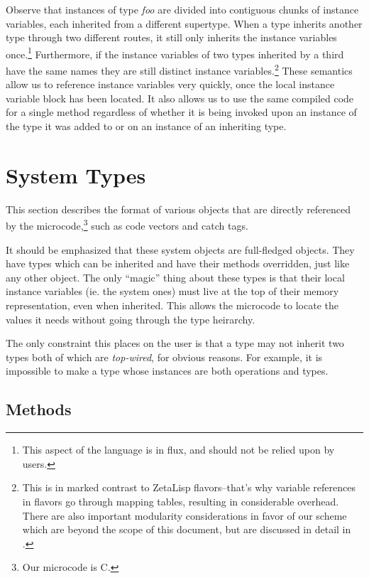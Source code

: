 Observe that instances of type \emph{foo} are divided into contiguous
chunks of instance variables, each inherited from a different
supertype.  When a type inherits another type through two different
routes, it still only inherits the instance variables
once.\footnote{This aspect of the language is in flux, and should not
be relied upon by users.} Furthermore, if the instance variables of
two types inherited by a third have the same names they are still
distinct instance variables.\footnote{This is in marked contrast to
ZetaLisp flavors--that's why variable references in flavors go through
mapping tables, resulting in considerable overhead.  There are also
important modularity considerations in favor of our scheme which are
beyond the scope of this document, but are discussed in detail in
\citet{SNYDER86}.} These semantics allow us to reference instance
variables very quickly, once the local instance variable block has
been located.  It also allows us to use the same compiled code for a
single method regardless of whether it is being invoked upon an
instance of the type it was added to or on an instance of an
inheriting type.


\section{System Types}

This section describes the format of various objects that are directly
referenced by the microcode,\footnote{Our microcode is C.} such as
code vectors and catch tags.

It should be emphasized that these system objects are full-fledged objects.
They have types which can be inherited and have their methods overridden,
just like any other object.  The only ``magic'' thing about these types is
that their local instance variables (ie. the system ones) must live at the
top of their memory representation, even when inherited.  This allows the
microcode to locate the values it needs without going through the type
heirarchy.

The only constraint this places on the user is that a type may not inherit
two types both of which are \emph{top-wired}, for obvious reasons.  For
example, it is impossible to make a type whose instances are both
operations and types.

\subsection{Methods}

